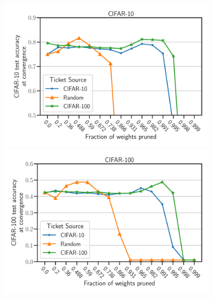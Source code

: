 \documentclass{article}
\begin{document}
\begin{figure}[h]
    \centering
    \begin{minipage}{.497\textwidth}
    \includegraphics[width=\textwidth]{plots/Exp2_ResNet_CIFAR10_N.pdf}
    \end{minipage}
    \begin{minipage}{.497\textwidth}
    \includegraphics[width=\textwidth]{plots/Exp2_ResNet_CIFAR100_N.pdf}

\end{minipage}
\end{figure}
\end{document}
